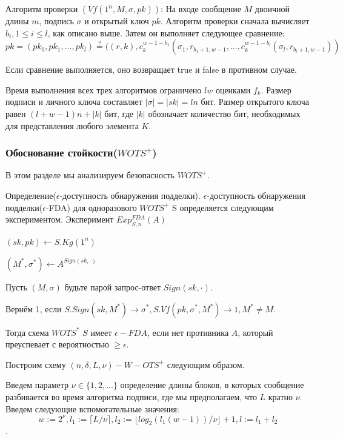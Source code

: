 \documentclass[a4paper, 14pt]{extarticle}
\begin{document}
Алгоритм проверки $(Vf(1^n, M, \sigma, pk))$: На входе сообщение $M$ двоичной длины $m$, подпись $\sigma$ и открытый ключ $pk$. Алгоритм проверки сначала вычисляет $b_{i}, 1 \leq i \leq l$, как описано выше. Затем он выполняет следующее сравнение:
\[ pk = (pk_{0}, pk_{1}, ..., pk_{l}) \stackrel{?}{=} ((r,k),c^{w - 1 - b_{1}}_{k}(\sigma_{1}, r_{b_{1} + 1, w - 1}, ..., c^{w - 1 - b_{l}}_{k}(\sigma_{l}, r_{b_{l} + 1, w - 1})) \]

Если сравнение выполняется, оно возвращает true и false в противном случае.

Время выполнения всех трех алгоритмов ограничено $lw$ оценками $f_{k}$. Размер подписи и личного ключа составляет $|\sigma| = |sk| = ln$ бит. Размер открытого ключа равен $(l + w - 1)n + |k|$ бит, где $|k|$ обозначает количество бит, необходимых для представления любого элемента $K$.
\subsubsection{Обоснование стойкости($WOTS^{+}$)}
В этом разделе мы анализируем безопасность $WOTS^{+}$.

Определение($\epsilon$-доступность обнаружения подделки). $\epsilon$-доступность обнаружения подделки($\epsilon$-FDA) для одноразового $WOTS^{+}$ S определяется следующим экспериментом.
\newpage
Эксперимент $Exp^{F D A}_{S,n}(A)$

\hspace{10mm} $(sk, pk) \leftarrow S.Kg(1^n)$

\hspace{10mm} $(M^{*}, \sigma^{*}) \leftarrow A^{Sign(sk,\cdot)}$

Пусть $(M, \sigma)$ будьте парой запрос-ответ $Sign(sk,\cdot)$.

Вернём 1, если $S.Sign(sk, M^{*}) \rightarrow \sigma^{*}, S.Vf(pk, \sigma^{*}, M^{*}) \rightarrow 1, M^{*} \neq M$.

Тогда схема $WOTS^{*}$ $S$ имеет $\epsilon-FDA$, если нет противника $A$, который преуспевает с вероятностью $\geq \epsilon$.

Построим схему $(n, \delta, L, \nu)-W-OTS^{+}$ следующим образом.

Введем параметр $\nu \in \{1, 2, ...\}$ определение длины блоков, в которых сообщение разбивается во время алгоритма подписи, где мы предполагаем, что $L$ кратно $\nu$. Введем следующие вспомогательные значения:
\[w := 2^{\nu}, l_{1} := \lceil L/\nu \rceil, l_{2} := \lfloor log_{2}(l_{1}(w - 1))/\nu \rfloor + 1, l := l_{1} + l_{2}\].
\end{document}
